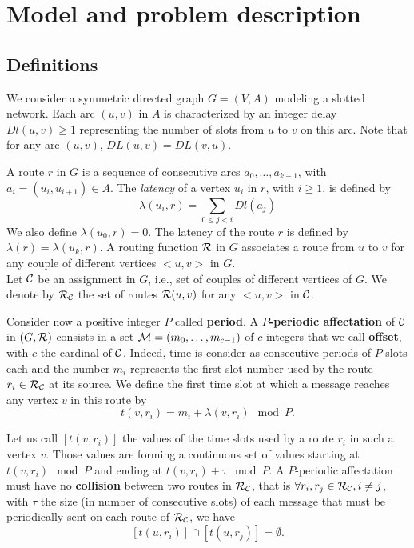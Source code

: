 \documentclass{article}
\begin{document}
\section{Model and problem description}
\subsection{Definitions}
We consider a symmetric directed graph $G=(V,A)$ modeling a slotted network. Each arc  $(u,v)$ in $A$ is characterized by an integer delay $Dl(u,v) \geq 1$ representing the number of slots from $u$ to $v$ on this arc. Note that for any arc $(u,v)$, $DL(u,v)=DL(v,u)$.

A route $r$ in $G$ is a sequence of consecutive arcs $a_0, \ldots , a_{k-1}$, with $a_i=(u_i,u_{i+1}) \in A$.  The {\em latency} of a vertex $u_i$ in $r$, with $i \geq 1$, is defined by $$\lambda(u_i,r)= \sum\limits_{0 \leq j <i} Dl(a_j)$$ We also define $\lambda(u_0,r)=0$.
The latency of the route $r$ is defined by $\lambda (r)= \lambda (u_k,r)$.  A routing function $\cal R$ in $G$ associates a route from $u$ to $v$ for any couple of different vertices $<u,v>$ in $G$.\\

Let $\cal C$ be an {assignment} in $G$, i.e., set of couples of different vertices of $G$. We denote by $\cal R_{\cal C}$ the set of routes ${\cal R}(u,v)$ for any $<u,v>$ in $\cal C$. 

Consider now a positive integer $P$ called {\bf period}. A {\bf $P$-periodic affectation} of $\cal C$ in $(G,{\cal R})$ consists in a set  ${\cal M}=(m_0, \ldots ,m_{c-1})$
of $c$ integers that we call {\bf offset}, with $c$ the cardinal of $\cal C$. Indeed, time is consider as consecutive periods of $P$ slots each and the number $m_i$ represents the first slot number used by the route $r_i \in {\cal R}_{\cal C}$ at its source.
We define the first time slot at which a message reaches any vertex $v$ in this route by $$t(v,r_i) = m_i+\lambda(v,r_i) \mod P.$$

Let us call $[t(v,r_i)]$ the values of the time slots used by a route $r_i$ in such a vertex $v$. 
Those values are forming a continuous set of values starting at $t(v,r_i) \mod P$ and ending at $t(v,r_i) + \tau \mod P$. A $P$-periodic affectation must have no {\bf collision} between two routes in ${\cal R}_{\cal C}$, that is $\forall r_i, r_j \in {\cal R}_{\cal C}, i \ne j$, with $\tau$ the size (in number of consecutive slots) of each message that must be periodically sent on each route of ${\cal R}_{\cal C}$,
we have $$[t(u,r_i)] \cap [t(u,r_j)] = \emptyset .$$
\end{document}
